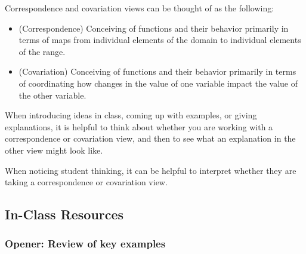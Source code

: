 \documentclass[11pt]{article}
\newcommand{\handout}{\subsubsection}
\newcommand\header[1]{\vspace*{4pt}\par {\large {\bf #1}}\par}
\theoremstyle{definition}
\begin{document}
Correspondence and covariation views can be thought of as the following:
\begin{itemize}
	\item (Correspondence) Conceiving of functions and their behavior primarily in terms of maps from individual elements of the domain to individual elements of the range. 
	\item (Covariation) Conceiving of functions and their behavior primarily in terms of coordinating how changes in the value of one variable impact the value of the other variable.
\end{itemize}

When introducing ideas in class, coming up with examples, or giving explanations, it is helpful to think about whether you are working with a correspondence or covariation view, and then to see what an explanation in the other view might look like. 

When noticing student thinking, it can be helpful to interpret whether they are taking a correspondence or covariation view.

\newpage \subsection{In-Class Resources}  
\handout{Opener: Review of key examples}
\end{document}
